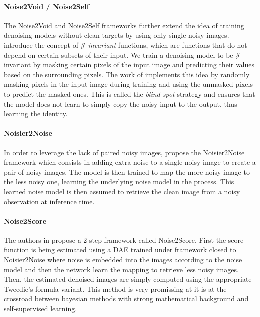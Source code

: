 \paragraph{Noise2Void / Noise2Self}

The Noise2Void \cite{krull_noise2void_2019} and Noise2Self \cite{batson_noise2self_nodate} frameworks further extend the idea of training denoising models without clean targets by using only single noisy images.
 introduce the concept of \textit{$\mathcal{J}$-invariant} functions, which are functions that do not depend on certain subsets of their input.
We train a denoising model to be $\mathcal{J}$-invariant by masking certain pixels of the input image and predicting their values based on the surrounding pixels.
The work of  implements this idea by randomly masking pixels in the input image during training and using the unmasked pixels to predict the masked ones.
This is called the \textit{blind-spot} strategy and ensures that the model does not learn to simply copy the noisy input to the output, thus learning the identity.

\paragraph{Noisier2Noise}

In order to leverage the lack of paired noisy images,  propose the Noisier2Noise framework which consists in adding extra noise to a single noisy image to create a pair of noisy images.
The model is then trained to map the more noisy image to the less noisy one, learning the underlying noise model in the process.
This learned noise model is then assumed to retrieve the clean image from a noisy observation at inference time.

\paragraph{Noise2Score}

The authors in \cite{kim_noise2score_nodate} propose a 2-step framework called Noise2Score. First the score function is being estimated using a DAE trained under framework closed to Noisier2Noise \cite{moran_noisier2noise_2019} where noise is embedded into the images according to the noise model and then the network learn the mapping to retrieve less noisy images.
Then, the estimated denoised images are simply computed using the appropriate Tweedie's formula variant.
This method is very promissing at it is at the crossroad between bayesian methods with strong mathematical background and self-supervised learning.

